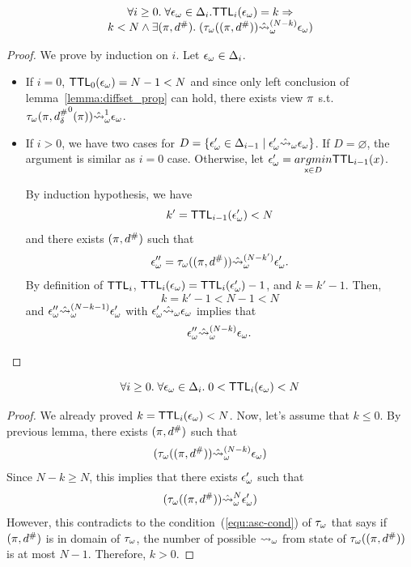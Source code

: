 \begin{lemma}\label{lemma:prop-ttl}
  \[
    \begin{array}{c}
      \forall i \geq 0. \; \forall {\epsilon}_\omega \in \Delta_i.
      \textsf{TTL}_i({\epsilon}_\omega) = k \Rightarrow \\
      k < N \wedge
      \exists (\pi, {d}^{\#}). \; ({\tau}_\omega((\pi,{d}^{\#}))
      \hat{\leadsto}_\omega^{(N - k)} {\epsilon}_\omega) \\
    \end{array}
  \]
\end{lemma}
\begin{proof}
  We prove by induction on $i$.
  Let ${\epsilon}_\omega \in \Delta_i$.
  \begin{itemize}
  \item If $i = 0$, $\textsf{TTL}_0({\epsilon}_\omega) = N - 1 < N$
  and since only left conclusion of lemma~\ref{lemma:diffset_prop} can hold,
  there exists view $\pi$ s.t.
  ${\tau}_\omega(\pi, {{d}^{\#}_\delta}^0(\pi)) \hat{\leadsto}_\omega^1 {\epsilon}_\omega$.
  \item If $i > 0$, we have two cases for $D = 
    \{{\epsilon}_\omega' \in \Delta_{i-1} \mid {\epsilon}_\omega' \hat{\leadsto}_\omega {\epsilon}_\omega\}$.
  If $D = \varnothing$, the argument is similar as $i = 0$ case.
  Otherwise, let ${\epsilon}_\omega' = \underset{{\textsf{x}} \in D}{argmin}{\textsf{TTL}_{i-1}(x)}$.
  
  By induction hypothesis, we have
  \[
    k' = \textsf{TTL}_{i-1}({\epsilon}_\omega') < N
  \]
  and there exists $(\pi, {d}^{\#})$ such that
  \[
    {\epsilon}_\omega'' = {\tau}_\omega((\pi,{d}^{\#})) \hat{\leadsto}_\omega^{(N - k')} {\epsilon}_\omega'.
  \]
  By definition of $\textsf{TTL}_i$,
  $\textsf{TTL}_i({\epsilon}_\omega) = \textsf{TTL}_i({\epsilon}_\omega') - 1$, and $k = k' - 1$.
  Then,
  \[
    k = k' - 1 < N - 1 < N
  \]
  and
  ${\epsilon}_\omega'' \hat{\leadsto}_\omega^{(N - k - 1)} {\epsilon}_\omega'$ with
  ${\epsilon}_\omega' \hat{\leadsto}_\omega {\epsilon}_\omega$ implies that
  \[
    {\epsilon}_\omega'' \hat{\leadsto}_\omega^{(N - k)} {\epsilon}_\omega.
  \]
  \end{itemize}
\end{proof}
\begin{corollary}\label{corollary:bounded-ttl}
  \[
    \forall i \geq 0. \; \forall {\epsilon}_\omega \in \Delta_i. \;
    0 < \textsf{TTL}_i({\epsilon}_\omega) < N
  \]
\end{corollary}
\begin{proof}
We already proved $k = \textsf{TTL}_i({\epsilon}_\omega) < N$.
Now, let's assume that $k \leq 0$.
By previous lemma, there exists $(\pi, {d}^{\#})$ such that
\[
  ({\tau}_\omega((\pi,{d}^{\#})) \hat{\leadsto}_\omega^{(N - k)} {\epsilon}_\omega)
\]
Since $N - k \geq N$, this implies that there exists ${\epsilon}_\omega'$ such that
\[
  ({\tau}_\omega((\pi,{d}^{\#})) \hat{\leadsto}_\omega^N {\epsilon}_\omega')
\]
However, this contradicts to the condition~(\ref{equ:asc-cond}) of ${\tau}_\omega$ that says
if $(\pi,{d}^{\#})$ is in domain of ${\tau}_\omega$,
the number of possible ${\leadsto}_\omega$ from state of ${\tau}_\omega((\pi,{d}^{\#}))$
is at most $N - 1$.
Therefore, $k > 0$.
\end{proof}

